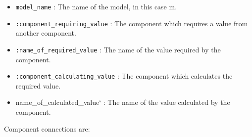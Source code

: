 \documentclass[
]{article}
\providecommand{\tightlist}{%
  \setlength{\itemsep}{0pt}\setlength{\parskip}{0pt}}
\begin{document}
\begin{itemize}
\tightlist
\item
  \texttt{model\_name} : The name of the model, in this case m.
\item
  \texttt{:component\_requiring\_value} : The component which requires a
  value from another component.
\item
  \texttt{:name\_of\_required\_value} : The name of the value required
  by the component.
\item
  \texttt{:component\_calculating\_value} : The component which
  calculates the required value.
\item
  name\_of\_calculated\_value` : The name of the value calculated by the
  component.
\end{itemize}

Component connections are: 
\end{document}

